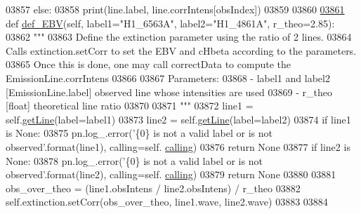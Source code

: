 \begin{DoxyCode}
{{{{{{{{{{{{{{{{{{{{{{03857             \textcolor{keywordflow}{else}:
03858                 print(line.label, line.corrIntens[obsIndex])
03859     
03860             
\hypertarget{pynebcore_8py_source_l03861}{}\hyperlink{classpyneb_1_1core_1_1pynebcore_1_1_observation_ab01150e82809bd712a1b1f09d250db94}{03861}     \textcolor{keyword}{def }\hyperlink{classpyneb_1_1core_1_1pynebcore_1_1_observation_ab01150e82809bd712a1b1f09d250db94}{def\_EBV}(self, label1="H1\_6563A", label2="H1\_4861A", r\_theo=2.85):
03862         \textcolor{stringliteral}{"""}
03863 \textcolor{stringliteral}{        Define the extinction parameter using the ratio of 2 lines.}
03864 \textcolor{stringliteral}{        Calls extinction.setCorr to set the EBV and cHbeta according to the parameters.}
03865 \textcolor{stringliteral}{        Once this is done, one may call correctData to compute the EmissionLine.corrIntens}
03866 \textcolor{stringliteral}{        }
03867 \textcolor{stringliteral}{        Parameters:}
03868 \textcolor{stringliteral}{            - label1 and label2 [EmissionLine.label] observed line whose intensities are used}
03869 \textcolor{stringliteral}{            - r\_theo [float] theoretical line ratio}
03870 \textcolor{stringliteral}{}
03871 \textcolor{stringliteral}{        """}
03872         line1 = self.\hyperlink{classpyneb_1_1core_1_1pynebcore_1_1_observation_a9994c84a500a6a31a5376ed6c7782ce3}{getLine}(label=label1)
03873         line2 = self.\hyperlink{classpyneb_1_1core_1_1pynebcore_1_1_observation_a9994c84a500a6a31a5376ed6c7782ce3}{getLine}(label=label2)
03874         \textcolor{keywordflow}{if} line1 \textcolor{keywordflow}{is} \textcolor{keywordtype}{None}:
03875             pn.log\_.error(\textcolor{stringliteral}{'\{0\} is not a valid label or is not observed'}.format(line1), calling=self.
      \hyperlink{classpyneb_1_1core_1_1pynebcore_1_1_observation_a2639fad9af4fefad20e4097295bd40e7}{calling})
03876             \textcolor{keywordflow}{return} \textcolor{keywordtype}{None}
03877         \textcolor{keywordflow}{if} line2 \textcolor{keywordflow}{is} \textcolor{keywordtype}{None}:
03878             pn.log\_.error(\textcolor{stringliteral}{'\{0\} is not a valid label or is not observed'}.format(line2), calling=self.
      \hyperlink{classpyneb_1_1core_1_1pynebcore_1_1_observation_a2639fad9af4fefad20e4097295bd40e7}{calling})
03879             \textcolor{keywordflow}{return} \textcolor{keywordtype}{None}
03880 
03881         obs\_over\_theo = (line1.obsIntens / line2.obsIntens) / r\_theo 
03882         self.extinction.setCorr(obs\_over\_theo, line1.wave, line2.wave)
03883         
03884  
}}}}}}}}}}}}}}}}}}}}}}
\end{DoxyCode}
